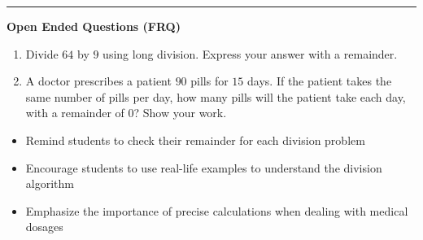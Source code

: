 \documentclass[10pt]{article}
\begin{document}
\vspace{-0.2cm}
\hrule
\vspace{0.2cm}
\textbf{\small Open Ended Questions (FRQ)}
\begin{enumerate}[label=\textbf{Q\arabic*.}, start=9, itemsep=5pt, topsep=0pt]

  \item \small Divide $64$ by $9$ using long division. Express your answer with a remainder. \vspace{2cm}

  \item \small A doctor prescribes a patient $90$ pills for $15$ days. If the patient takes the same number of pills per day, how many pills will the patient take each day, with a remainder of $0$? Show your work. \vspace{2cm}

\end{enumerate}

\vfill

\begin{tcolorbox}[colback=blue!5, colframe=mainblue!50, title=\small \textbf{Chef's Tips}, fonttitle=\bfseries, bottom=1mm]
\begin{itemize}[noitemsep, topsep=2pt, leftmargin=0.5cm]
  \item \scriptsize Remind students to check their remainder for each division problem\item \scriptsize Encourage students to use real-life examples to understand the division algorithm\item \scriptsize Emphasize the importance of precise calculations when dealing with medical dosages
\end{itemize}
\end{tcolorbox}
\end{document}
